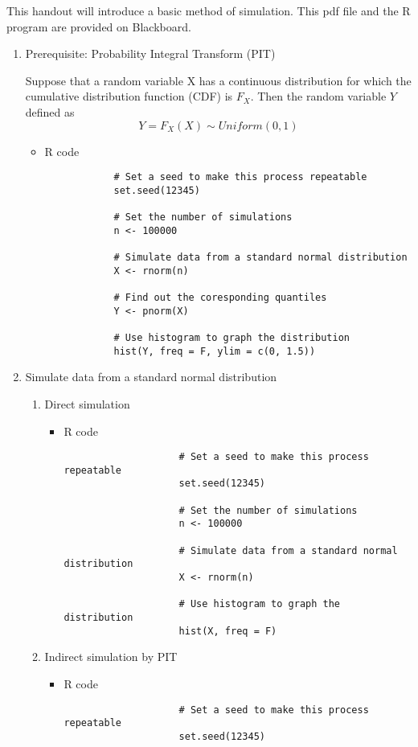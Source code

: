 This handout will introduce a basic method of simulation. This pdf file and the R program are provided on Blackboard.
\begin{enumerate}
	\item Prerequisite: Probability Integral Transform (PIT)
	\par Suppose that a random variable X has a continuous distribution for which the cumulative distribution function (CDF) is $F_X$. Then the random variable $Y$ defined as
	\begin{equation*}
		Y = F_X(X) \sim Uniform(0,1)
	\end{equation*}
	\begin{itemize}
		\item R code
		\begin{verbatim}
			# Set a seed to make this process repeatable
			set.seed(12345) 
		
			# Set the number of simulations
			n <- 100000
			
			# Simulate data from a standard normal distribution
			X <- rnorm(n)
			
			# Find out the coresponding quantiles
			Y <- pnorm(X)
			
			# Use histogram to graph the distribution
			hist(Y, freq = F, ylim = c(0, 1.5))
		\end{verbatim}
	\end{itemize}
	\item Simulate data from a standard normal distribution
		\begin{enumerate}
			\item Direct simulation
				\begin{itemize}
					\item R code
					\begin{verbatim}
					# Set a seed to make this process repeatable
					set.seed(12345) 
					
					# Set the number of simulations
					n <- 100000
					
					# Simulate data from a standard normal distribution
					X <- rnorm(n)
					
					# Use histogram to graph the distribution
					hist(X, freq = F)
					\end{verbatim}
				\end{itemize}
				
			\item Indirect simulation by PIT
				\begin{itemize}
					\item R code
					\begin{verbatim}
					# Set a seed to make this process repeatable
					set.seed(12345) 
					

\end{verbatim}
\end{itemize}
\end{enumerate}
\end{enumerate}
